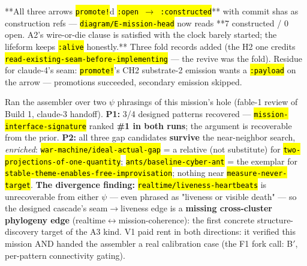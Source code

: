 \documentclass[11pt,oneside]{article}
\newcommand{\scopehl}[1]{\texttt{\hl{#1}}}
\begin{document}
\begin{phasebox}[title={7. DOCUMENT (opened 2026-06-10) --- "Anatomy of a Futonic Mission (from the HEAD down)"}]
\begin{subbox}[title={6.1 INSTANTIATE closed (2026-06-10) --- three bells, three folds, A2 satisfied}]
**All three arrows \scopehl{promote!}d \scopehl{:open $\rightarrow$ :constructed}** with commit shas as
construction refs --- \scopehl{diagram/E-mission-head} now reads **7 constructed / 0
open. A2's wire-or-die clause is satisfied with the clock barely started;
the lifeform keeps \scopehl{:alive} honestly.** Three fold records added (the H2 one
credits \scopehl{read-existing-seam-before-implementing} --- the revive was the fold).
Residue for claude-4's seam: \scopehl{promote!}'s CH2 substrate-2 emission wants a
\scopehl{:payload} on the arrow --- promotions succeeded, secondary emission skipped.

\end{subbox}
\begin{subbox}[title={V1 --- RUN (2026-06-10, via claude-3's construct\_cascade review): VALIDATED, with one discovery}]

Ran the assembler over two $\psi$ phrasings of this mission's hole (fable-1 review of
Build 1, claude-3 handoff). \textbf{P1:} 3/4 designed patterns recovered ---
\scopehl{mission-interface-signature} ranked \textbf{\#1 in both runs}; the argument is
recoverable from the prior. \textbf{P2:} all three gap candidates \textbf{survive} the
near-neighbor search, \emph{enriched}: \scopehl{war-machine/ideal-actual-gap} = a relative
(not substitute) for \scopehl{two-projections-of-one-quantity};
\scopehl{ants/baseline-cyber-ant} = the exemplar for
\scopehl{stable-theme-enables-free-improvisation}; nothing near
\scopehl{measure-never-target}. \textbf{The divergence finding:}
\scopehl{realtime/liveness-heartbeats} is unrecoverable from either $\psi$ --- even phrased
as "liveness or visible death" --- so the designed cascade's seam$\rightarrow$liveness edge
is a \textbf{missing cross-cluster phylogeny edge} (realtime$\leftrightarrow$mission-coherence):
the first concrete structure-discovery target of the A3 kind. V1 paid rent in
both directions: it verified this mission AND handed the assembler a real
calibration case (the F1 fork call: B$'$, per-pattern connectivity gating).

\end{subbox}
\end{phasebox}
\end{document}
